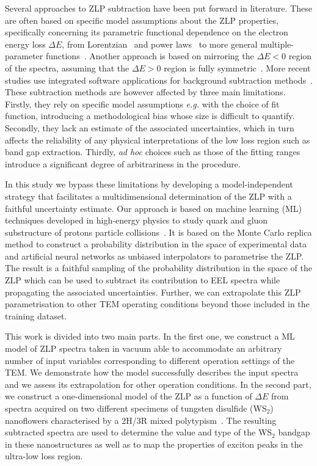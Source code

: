 Several approaches to ZLP subtraction\cite{Rafferty:2000, Stoger:2008, Egerton:1996} 
have been put forward in literature.
%
These are often based on specific model assumptions about the ZLP properties, specifically
concerning its parametric functional dependence on the electron energy loss $\Delta E$,
from Lorentzian~\cite{Dorneich:1998}
and power laws~\cite{Erni:2005} to more general multiple-parameter functions~\cite{Benthem:2001}.
%
Another approach is based on mirroring the $\Delta E <0$ region of the spectra, assuming
that the $\Delta E>0$ region is fully symmetric~\cite{Lazar:2003}.
%
More recent studies use integrated software applications for background subtraction 
methods~\cite{Egerton:10.1016/S0304-3991(01)00155-3, Held:2020, Granerod:2018, Fung:2020}.
%
These  subtraction methods are however affected by three main limitations.
%
Firstly, they rely on specific model assumptions {\it e.g.} with
the choice of fit function, introducing a methodological
bias whose size is difficult to quantify.
%
Secondly, they lack an estimate of the associated uncertainties, which in turn affects
the reliability of any physical interpretations of the low loss region such as
band gap extraction.
%
Thirdly, {\it ad hoc} choices such as those of the fitting ranges introduce a significant degree of
arbitrariness in the procedure.

In this study we bypass these limitations by developing a model-independent strategy
that facilitates a multidimensional determination of the ZLP
with a faithful uncertainty estimate.
%
Our approach is based on machine learning (ML) techniques
developed in high-energy physics to study
quark and gluon substructure of protons
particle collisions~\cite{Ball:2008by,Ball:2012cx,Ball:2014uwa,Ball:2017nwa}.
%
It is based on the Monte Carlo replica method to construct a probability
distribution in the space of experimental data and artificial
neural networks as unbiased interpolators to parametrise the ZLP.
%
The result is
a faithful sampling of the probability distribution in the space of the ZLP
which can be used to subtract its contribution to EEL spectra while
propagating the associated uncertainties.
%
Further, we can extrapolate this ZLP parametrisation to other TEM
operating conditions beyond those included in the training dataset.
%

This work is divided into two main parts.
%
In the first one, we construct a ML model of ZLP spectra taken
in vacuum able to accommodate an arbitrary number of input
variables corresponding to different operation settings of the TEM.
%
We demonstrate how the model successfully describes the
input spectra and we assess its extrapolation for other operation
conditions.
%
In the second part, we construct a one-dimensional model
of the ZLP as a function of $\Delta E$ from spectra acquired on two different specimens of
tungsten disulfide (WS$_2$) nanoflowers characterised by a 2H/3R mixed polytypism~\cite{SabryaWS2}.
%
The resulting subtracted spectra are used to determine
the value and type of the WS$_2$ bandgap in these nanostructures
as well as to map the properties of exciton peaks in the ultra-low
loss region.

